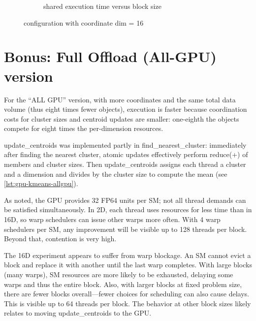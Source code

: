 \documentclass{article}
\newcommand{\eng}[1]{#1}
\begin{document}
\begin{figure}[h]
\begin{subfigure}{0.65\textwidth}
        \caption{\eng{shared} execution time versus \eng{block size}}
        \label{fig:shared_pbs16}
    \end{subfigure}
    \caption{\eng{configuration with coordinate dim = 16}}
\end{figure}
\FloatBarrier

\clearpage
\section{\eng{Bonus: Full Offload (All-GPU) version}}

For the “ALL GPU” version, with more coordinates and the same total data volume (thus eight times fewer objects), execution is faster because coordination costs for cluster sizes and centroid updates are smaller: one-eighth the objects compete for eight times the per-dimension resources.

\eng{update\_centroids} was implemented partly in \eng{find\_nearest\_cluster}: immediately after finding the nearest cluster, atomic updates effectively perform \eng{reduce(+)} of members and cluster sizes. Then \eng{update\_centroids} assigns each thread a cluster and a dimension and divides by the cluster size to compute the mean (see \ref{lst:gpu-kmeans-allgpu}).

As noted, the GPU provides 32 FP64 units per SM; not all thread demands can be satisfied simultaneously. In 2D, each thread uses resources for less time than in 16D, so warp schedulers can issue other warps more often. With 4 warp schedulers per SM, any improvement will be visible up to 128 threads per block. Beyond that, contention is very high.

The 16D experiment appears to suffer from \eng{warp blockage}. An SM cannot evict a block and replace it with another until the last warp completes. With large blocks (many warps), SM resources are more likely to be exhausted, delaying some warps and thus the entire block. Also, with larger blocks at fixed problem size, there are fewer blocks overall—fewer choices for scheduling can also cause delays. This is visible up to 64 threads per block. The behavior at other block sizes likely relates to moving \eng{update\_centroids} to the GPU.
\end{document}

